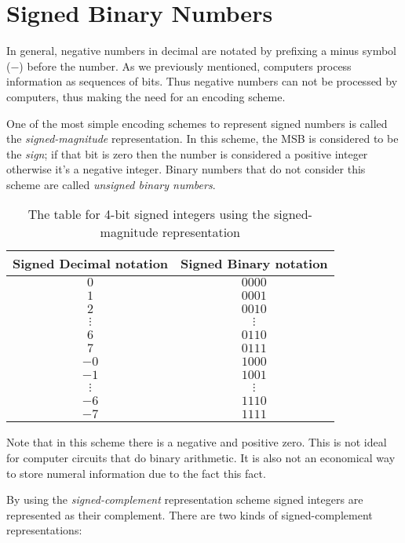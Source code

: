 \section{Signed Binary Numbers}

In general, negative numbers in decimal are notated by prefixing a minus
symbol ($-$) before the number. As we previously mentioned, computers
process information as sequences of bits. Thus negative numbers can not
be processed  by computers, thus making the need for an
encoding scheme.

One of the most simple encoding schemes to represent signed numbers
is called the \textit{signed-magnitude} representation. In this
scheme, the MSB is considered to be the \textit{sign}; if that
bit is zero then the number is considered a positive integer
otherwise it's a negative integer. Binary numbers that do
not consider this scheme are called \textit{unsigned binary numbers}.

\begin{table}[ht]
    \centering
    \begin{tabular}{c|c}
        Signed Decimal notation & Signed Binary notation \\
        \hline
        $0$ & $0000$ \\
        $1$ & $0001$ \\
        $2$ & $0010$ \\
        $\vdots$ & $\vdots$ \\
        $6$  & $0110$ \\
        $7$  & $0111$ \\
        $-0$ & $1000$ \\
        $-1$ & $1001$ \\
        $\vdots$ & $\vdots$ \\
        $-6$ & $1110$ \\
        $-7$ & $1111$ \\
    \end{tabular}
    \caption{The table for 4-bit signed integers using the signed-magnitude representation}
\end{table}

Note that in this scheme there is a negative and positive zero.
This is not ideal for computer circuits that do binary arithmetic.
It is also not an economical way to store numeral information
due to the fact this fact.

By using the \textit{signed-complement} representation scheme
signed integers are represented as their complement. There
are two kinds of signed-complement representations:

